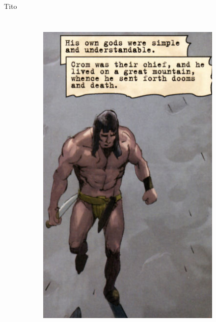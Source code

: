 \begin{frame}{Tito}
\begin{columns}
\begin{figure}[htp]
\begin{subfigure}[b]{0.27\textwidth}
				\includegraphics[width=\textwidth]{img/conan/DH}
			\end{subfigure}
			~
			\begin{subfigure}[b]{0.23\textwidth}

\end{subfigure}
\end{figure}
\end{columns}
\end{frame}
